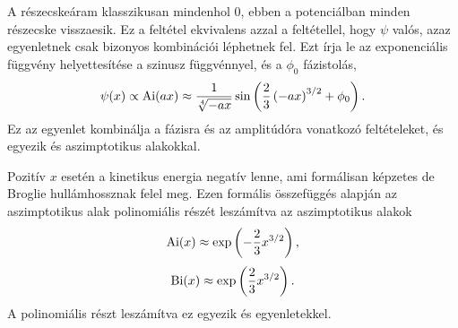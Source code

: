 A részecskeáram klasszikusan mindenhol $0$, ebben a potenciálban minden részecske visszaesik. Ez a feltétel ekvivalens azzal a feltétellel, hogy $\psi$ valós, azaz  egyenletnek csak bizonyos kombinációi léphetnek fel. Ezt írja le az exponenciális függvény helyettesítése a szinusz függvénnyel, és a $\phi_0$ fázistolás,
\begin{equation}
	\psi(x)\propto\operatorname{Ai}(ax)\approx\frac{1}{\sqrt[4]{-ax}}\sin\left(\frac{2}{3}\left(-ax\right)^{3/2}+\phi_0\right).
\end{equation}
Ez az egyenlet kombinálja a fázisra és az amplitúdóra vonatkozó feltételeket, és egyezik  és  aszimptotikus alakokkal.

Pozitív $x$ esetén a kinetikus energia negatív lenne, ami formálisan képzetes de Broglie hullámhossznak felel meg. Ezen formális összefüggés alapján az aszimptotikus alak polinomiális részét leszámítva az aszimptotikus alakok
\begin{equation}
	\operatorname{Ai}(x)\approx\exp\left(-\frac{2}{3}x^{3/2}\right),
\end{equation}
\begin{equation}
	\operatorname{Bi}(x)\approx\exp\left(\frac{2}{3}x^{3/2}\right).
\end{equation}
A polinomiális részt leszámítva ez egyezik  és  egyenletekkel.


